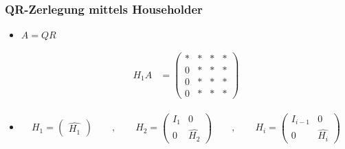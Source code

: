 \clearpage
\setcounter{page}{4}
\begin{frame}
	\frametitle{QR-Zerlegung mittels Householder}

	\begin{itemize}
		\item $ A = QR $
		
		\begin{align*}
			H_1 A &= \left( 
			\begin{array}{cccc}
			* & * & * & * \\ 
			0 & * & * & * \\ 
			0 & * & * & * \\ 
			0 & * & * & *
			\end{array}
			\right)
		\end{align*} 
	
	\item
	\begin{align*}
	H_1 = \begin{pmatrix}
	\hat{H_1} 
	\end{pmatrix} \qquad , \qquad
	H_2 = \left(\begin{array}{l|l}
	I_{1} & 0\\ \hline
	0 & \hat{H_2} 	
	\end{array} \right)\qquad , \qquad
	H_i = \left(\begin{array}{l|l}
	I_{i-1} & 0\\ \hline
	0 & \hat{H_i} 	
	\end{array} \right)
	\end{align*}
	\end{itemize}
\end{frame}

